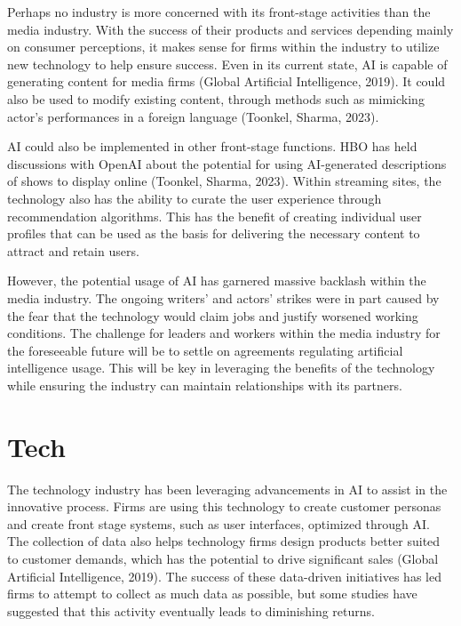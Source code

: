 \documentclass[
]{book}
\begin{document}
Perhaps no industry is more concerned with its front-stage activities than the media industry. With the success of their products and services depending mainly on consumer perceptions, it makes sense for firms within the industry to utilize new technology to help ensure success. Even in its current state, AI is capable of generating content for media firms (Global Artificial Intelligence, 2019). It could also be used to modify existing content, through methods such as mimicking actor's performances in a foreign language (Toonkel, Sharma, 2023).

AI could also be implemented in other front-stage functions. HBO has held discussions with OpenAI about the potential for using AI-generated descriptions of shows to display online (Toonkel, Sharma, 2023). Within streaming sites, the technology also has the ability to curate the user experience through recommendation algorithms. This has the benefit of creating individual user profiles that can be used as the basis for delivering the necessary content to attract and retain users.

However, the potential usage of AI has garnered massive backlash within the media industry. The ongoing writers' and actors' strikes were in part caused by the fear that the technology would claim jobs and justify worsened working conditions. The challenge for leaders and workers within the media industry for the foreseeable future will be to settle on agreements regulating artificial intelligence usage. This will be key in leveraging the benefits of the technology while ensuring the industry can maintain relationships with its partners.

\hypertarget{tech}{%
\section{Tech}\label{tech}}

The technology industry has been leveraging advancements in AI to assist in the innovative process. Firms are using this technology to create customer personas and create front stage systems, such as user interfaces, optimized through AI. The collection of data also helps technology firms design products better suited to customer demands, which has the potential to drive significant sales (Global Artificial Intelligence, 2019). The success of these data-driven initiatives has led firms to attempt to collect as much data as possible, but some studies have suggested that this activity eventually leads to diminishing returns.
\end{document}
